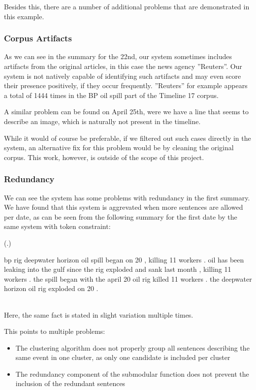 \documentclass[a4paper,BCOR=10mm]{report}
\newcounter{quotecount}[chapter]
\newcommand{\countquote}[1]{\vspace{1cm}\refstepcounter{quotecount}%
     (\thechapter.\arabic{quotecount}) \hspace*{1cm} \parbox{9cm}{#1}\\[1cm]}
\numberwithin{lemma}{chapter}
\numberwithin{definition}{chapter}
\begin{document}
Besides this, there are a number of additional problems that are demonstrated in this example.

\subsubsection{Corpus Artifacts}

As we can see in the summary for the 22nd, our system sometimes includes artifacts from the original articles, in this case the news agency ''Reuters''. Our system is not natively capable of identifying such artifacts and may even score their presence positively, if they occur frequently.
''Reuters'' for example appears a total of 1444 times in the BP oil spill part of the Timeline 17 corpus.

A similar problem can be found on April 25th, were we have a line that seems to describe an image, which is naturally not present in the timeline.

While it would of course be preferable, if we filtered out such cases directly in the system, an alternative fix for this problem would be by cleaning the original corpus. This work, however, is outside of the scope of this project.

\subsubsection{Redundancy}

We can see the system has some problems with redundancy in the first summary. We have found that this system is aggrevated when more sentences are allowed per date, as can be seen from the following summary for the first date by the same system with token constraint:

\countquote{
bp rig deepwater horizon oil spill began on 20 , killing 11 workers .
oil has been leaking into the gulf since the rig exploded and sank last month , killing 11 workers .
the spill began with the april 20 oil rig killed 11 workers .
the deepwater horizon oil rig exploded on 20 .
\label{ex:redundancy}
}

Here, the same fact is stated in slight variation multiple times.

This points to multiple problems:

\begin{itemize}
    \item{The clustering algorithm does not properly group all sentences describing the same event in one cluster, as only one candidate is included per cluster }
    \item{The redundancy component of the submodular function does not prevent the inclusion of the redundant sentences }
\end{itemize}
\end{document}
